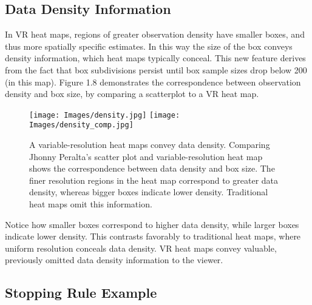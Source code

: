 \subsection{Data Density Information}

In VR heat maps, regions of greater observation density have smaller boxes, and thus more spatially specific estimates. In this way the size of the box conveys density information, which heat maps typically conceal. This new feature derives from the fact that box subdivisions persist until box sample sizes drop below 200 (in this map). Figure 1.8 demonstrates the correspondence between observation density and box size, by comparing a scatterplot to a VR heat map. 
        \begin{figure}[H]
      	\centering
      	\texttt{[image: Images/density.jpg]}
      	\texttt{[image: Images/density\_comp.jpg]} 
      	\caption{A variable-resolution heat maps convey data density. Comparing Jhonny Peralta's scatter plot and variable-resolution heat map shows the correspondence between data density and box size. The finer resolution regions in the heat map correspond to greater data density, whereas bigger boxes indicate lower density. Traditional heat maps omit this information.}
      	\end{figure}
Notice how smaller boxes correspond to higher data density, while larger boxes indicate lower density. This contrasts favorably to traditional heat maps, where uniform resolution conceals data density. VR heat maps convey valuable, previously omitted data density information to the viewer. 
      	
\subsection{Stopping Rule Example} %
      	
